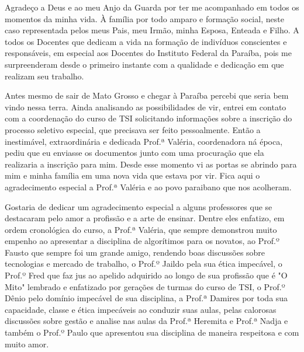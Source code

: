 
\begin{agradecimentos}[AGRADECIMENTOS]

    Agradeço a Deus e ao meu Anjo da Guarda  por ter me acompanhado em todos os momentos da minha vida. 
    À família por todo amparo e formação social, neste caso representada pelos meus Pais, meu Irmão, minha Esposa, Enteada e Filho. 
    A todos os Docentes que dedicam a vida na formação de indivíduos conscientes e responsáveis, em especial aos Docentes do Instituto Federal da Paraíba, pois me surpreenderam desde o primeiro instante com a qualidade e dedicação em que realizam seu trabalho.

    Antes mesmo de sair de Mato Grosso e chegar à Paraíba percebi que seria bem vindo nessa terra. Ainda analisando as possibilidades de vir, entrei em contato com a coordenação do curso de TSI solicitando informações sobre a inscrição do processo seletivo especial, que precisava ser feito pessoalmente. Então a inestimável, extraordinária e dedicada Prof.ª Valéria, coordenadora ná época, pediu que eu enviasse os documentos junto com uma procuração que ela realizaria a inscrição para mim. Desde esse momento vi as portas se abrindo para mim e minha família em uma nova vida que estava por vir. Fica aqui o agradecimento especial a Prof.ª Valéria e ao povo paraibano que nos acolheram.

    Gostaria de dedicar um agradecimento especial a alguns professores que se destacaram pelo amor a profissão e a arte de ensinar. Dentre eles enfatizo, em ordem cronológica do curso, a Prof.ª Valéria, que sempre demonstrou muito empenho ao apresentar a disciplina de algorítimos para os novatos, ao Prof.º Fausto que sempre foi um grande amigo, rendendo boas discussões sobre tecnologias e mercado de trabalho, o Prof.º Jaildo pela sua ética impecável, o Prof.º Fred que faz jus ao apelido adquirido ao longo de sua profissão que é "O Mito" lembrado e enfatizado por gerações de turmas do curso de TSI, o Prof.º Dênio pelo domínio impecável de sua disciplina, a Prof.ª Damires por toda sua capacidade, classe e ética impecáveis ao conduzir suas aulas, pelas calorosas discussões sobre gestão e analise nas aulas da Prof.ª Heremita e Prof.ª Nadja e também o Prof.º Paulo que apresentou sua disciplina de maneira respeitosa e com muito amor. 

\end{agradecimentos}
